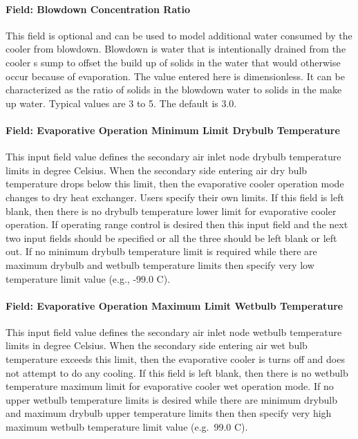 \paragraph{Field: Blowdown Concentration Ratio}\label{field-blowdown-concentration-ratio-2-000}

This field is optional and can be used to model additional water consumed by the cooler from blowdown. Blowdown is water that is intentionally drained from the cooler s sump to offset the build up of solids in the water that would otherwise occur because of evaporation. The value entered here is dimensionless. It can be characterized as the ratio of solids in the blowdown water to solids in the make up water. Typical values are 3 to 5. The default is 3.0.

\paragraph{Field: Evaporative Operation Minimum Limit Drybulb Temperature}\label{field-evaporative-operation-minimum-limit-drybulb-temperature}

This input field value defines the secondary air inlet node drybulb temperature limits in degree Celsius. When the secondary side entering air dry bulb temperature drops below this limit, then the evaporative cooler operation mode changes to dry heat exchanger. Users specify their own limits. If this field is left blank, then there is no drybulb temperature lower limit for evaporative cooler operation. If operating range control is desired then this input field and the next two input fields should be specified or all the three should be left blank or left out. If no minimum drybulb temperature limit is required while there are maximum drybulb and wetbulb temperature limits then specify very low temperature limit value (e.g., -99.0 C).

\paragraph{Field: Evaporative Operation Maximum Limit Wetbulb Temperature}\label{field-evaporative-operation-maximum-limit-wetbulb-temperature-1}

This input field value defines the secondary air inlet node wetbulb temperature limits in degree Celsius. When the secondary side entering air wet bulb temperature exceeds this limit, then the evaporative cooler is turns off and does not attempt to do any cooling. If this field is left blank, then there is no wetbulb temperature maximum limit for evaporative cooler wet operation mode. If no upper wetbulb temperature limits is desired while there are minimum drybulb and maximum drybulb upper temperature limits then then specify very high maximum wetbulb temperature limit value (e.g.~99.0 C).

